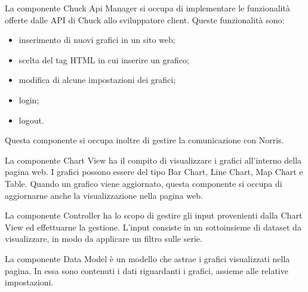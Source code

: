 
    		La componente Chuck Api Manager si occupa di implementare le funzionalità offerte dalle API di Chuck allo sviluppatore client. Queste funzionalità sono:
    		\begin{itemize}
						\item inserimento di nuovi grafici in un sito web;
						\item scelta del tag HTML in cui inserire un grafico;
						\item modifica di alcune impostazioni dei grafici;
						\item login;
						\item logout.
			\end{itemize}
    		Questa componente si occupa inoltre di gestire la comunicazione con Norris.
    		
    	La componente Chart View ha il compito di visualizzare i grafici all'interno della pagina web. I grafici possono essere del tipo Bar Chart, Line Chart, Map Chart e Table. Quando un grafico viene aggiornato, questa componente si occupa di aggiornarne anche la visualizzazione nella pagina web.

    	La componente Controller ha lo scopo di gestire gli input provenienti dalla Chart View ed effettuarne la gestione. L'input consiste in un sottoinsieme di dataset da visualizzare, in modo da applicare un filtro sulle serie.

    	La componente Data Model è un modello che astrae i grafici visualizzati nella pagina. In essa sono contenuti i dati riguardanti i grafici, assieme alle relative impostazioni.
    
	
